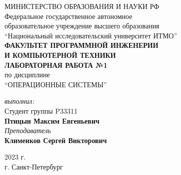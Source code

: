 
\BgThispage

\begin{center}
	МИНИСТЕРСТВО ОБРАЗОВАНИЯ И НАУКИ РФ\\
	\hfill \break
	Федеральное государственное автономное\\
	образовательное учреждение высшего образования\\
	``Национальный исследовательский университет ИТМО''\\
	\hfill \break
	\textbf{ФАКУЛЬТЕТ ПРОГРАММНОЙ ИНЖЕНЕРИИ \\
	И КОМПЬЮТЕРНОЙ ТЕХНИКИ}\\
	\vspace{2cm}
	\large{\textbf{ЛАБОРАТОРНАЯ РАБОТА №1}}\\
	\hfill \break
	по дисциплине\\
		\large{``ОПЕРАЦИОННЫЕ СИСТЕМЫ''}\\
	\hfill \break
\end{center}
\begin{flushright}
	\vspace{3cm}
	\textit{выполнил:}\\
	Студент группы P33311\\
	\textbf{Птицын Максим Евгеньевич}\\
	\textit{Преподаватель}\\
	\textbf{Клименков Сергей Викторович}
\end{flushright}
\vspace{5cm}
\begin{center}
	2023 г.\\
	г. Санкт-Петербург
\end{center}
\thispagestyle{empty}
\newpage